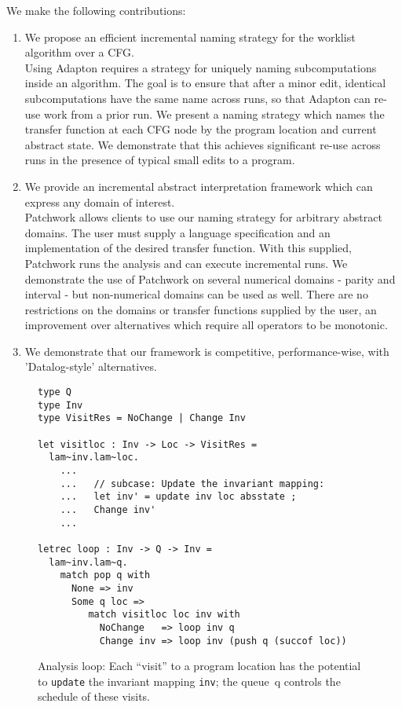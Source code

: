 \documentclass[acmlarge,anonymous]{acmart}\settopmatter{printfolios=true}
\newcommand{\code}[1]{\lstinline[basicstyle=\ttfamily]|#1|}
\begin{document}
We make the following contributions:

\begin{enumerate}
    \item We propose an efficient incremental naming strategy for the worklist algorithm over a CFG.\\
    Using Adapton requires a strategy for uniquely naming subcomputations inside an algorithm. The goal is to ensure that after a minor edit, identical subcomputations have the same name across runs, so that Adapton can re-use work from a prior run. We present a naming strategy which names the transfer function at each CFG node by the program location and current abstract state. We demonstrate that this achieves significant re-use across runs in the presence of typical small edits to a program.
    \item We provide an incremental abstract interpretation framework which can express any domain of interest.\\
    Patchwork allows clients to use our naming strategy for arbitrary abstract domains. The user must supply a language specification and an implementation of the desired transfer function. With this supplied, Patchwork runs the analysis and can execute incremental runs. We demonstrate the use of Patchwork on several numerical domains - parity and interval - but non-numerical domains can be used as well. There are no restrictions on the domains or transfer functions supplied by the user, an improvement over alternatives which require all operators to be monotonic.
    \item We demonstrate that our framework is competitive, performance-wise, with 'Datalog-style' alternatives.\\
\end{enumerate}

\begin{figure}
\begin{lstlisting}
type Q
type Inv
type VisitRes = NoChange | Change Inv

let visitloc : Inv -> Loc -> VisitRes =
  lam~inv.lam~loc.
    ...
    ...   // subcase: Update the invariant mapping:
    ...   let inv' = update inv loc absstate ;
    ...   Change inv'
    ...

letrec loop : Inv -> Q -> Inv =
  lam~inv.lam~q.
    match pop q with
      None => inv
      Some q loc =>
         match visitloc loc inv with
           NoChange   => loop inv q
           Change inv => loop inv (push q (succof loc))    
\end{lstlisting}
\caption{Analysis loop: Each ``visit'' to a program location has the
  potential to \code{update} the invariant mapping \code{inv}; the
  queue~{q} controls the schedule of these visits. }
\end{figure}
\end{document}
